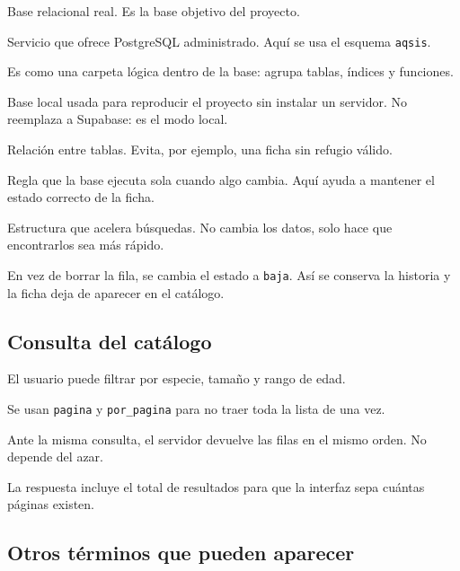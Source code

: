 \documentclass[11pt,a4paper]{article}
\newcommand{\code}[1]{\texttt{#1}}
\begin{document}
\begin{description}[leftmargin=*,style=nextline]
  \item[PostgreSQL.] Base relacional real. Es la base objetivo del proyecto.
  \item[Supabase.] Servicio que ofrece PostgreSQL administrado. Aquí se usa el
    esquema \code{aqsis}.
  \item[Esquema.] Es como una carpeta lógica dentro de la base: agrupa tablas,
    índices y funciones.
  \item[SQLite.] Base local usada para reproducir el proyecto sin instalar un
    servidor. No reemplaza a Supabase: es el modo local.
  \item[Llave foránea.] Relación entre tablas. Evita, por ejemplo, una ficha
    sin refugio válido.
  \item[Trigger.] Regla que la base ejecuta sola cuando algo cambia. Aquí
    ayuda a mantener el estado correcto de la ficha.
  \item[Índice.] Estructura que acelera búsquedas. No cambia los datos, solo
    hace que encontrarlos sea más rápido.
  \item[Baja lógica.] En vez de borrar la fila, se cambia el estado a
    \code{baja}. Así se conserva la historia y la ficha deja de aparecer en el
    catálogo.
\end{description}

\subsection{Consulta del catálogo}

\begin{description}[leftmargin=*,style=nextline]
  \item[Filtros.] El usuario puede filtrar por especie, tamaño y rango de edad.
  \item[Paginación.] Se usan \code{pagina} y \code{por\_pagina} para no traer
    toda la lista de una vez.
  \item[Orden estable.] Ante la misma consulta, el servidor devuelve las filas
    en el mismo orden. No depende del azar.
  \item[Total.] La respuesta incluye el total de resultados para que la interfaz
    sepa cuántas páginas existen.
\end{description}

\subsection{Otros términos que pueden aparecer}
\end{document}
